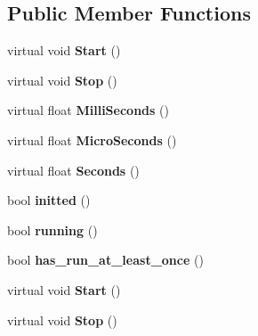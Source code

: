 \subsection*{Public Member Functions}
\begin{DoxyCompactItemize}
\item 
\mbox{\label{classcaffe_1_1_timer_ae387bcee3008150e8d9a8b95a5ca279c}} 
virtual void {\bfseries Start} ()
\item 
\mbox{\label{classcaffe_1_1_timer_ae99595b83e6ef8f1cfa4a933c359011b}} 
virtual void {\bfseries Stop} ()
\item 
\mbox{\label{classcaffe_1_1_timer_a236a04bd3da087fbd0d028977cce7a15}} 
virtual float {\bfseries Milli\+Seconds} ()
\item 
\mbox{\label{classcaffe_1_1_timer_a0cb08263942d10466d6a87b7a6e5b30b}} 
virtual float {\bfseries Micro\+Seconds} ()
\item 
\mbox{\label{classcaffe_1_1_timer_a5a5c499062bb98600cc061575c58510a}} 
virtual float {\bfseries Seconds} ()
\item 
\mbox{\label{classcaffe_1_1_timer_a8f44fdd43378c9ef58471c6aae17c814}} 
bool {\bfseries initted} ()
\item 
\mbox{\label{classcaffe_1_1_timer_ae1a416ef3dfd11aefc73da5760bc98d7}} 
bool {\bfseries running} ()
\item 
\mbox{\label{classcaffe_1_1_timer_ae06252439c4e1731a4c36b5a9810787c}} 
bool {\bfseries has\+\_\+run\+\_\+at\+\_\+least\+\_\+once} ()
\item 
\mbox{\label{classcaffe_1_1_timer_a50f32a520a733c9c3263fb28295aca71}} 
virtual void {\bfseries Start} ()
\item 
\mbox{\label{classcaffe_1_1_timer_a2c3b9c4e213219b7c0ce2e6426e6f570}} 
virtual void {\bfseries Stop} ()
\item 
\mbox{\label{classcaffe_1_1_timer_a3111241381a9fc669db8021ab9fe74b0}} 

\end{DoxyCompactItemize}
